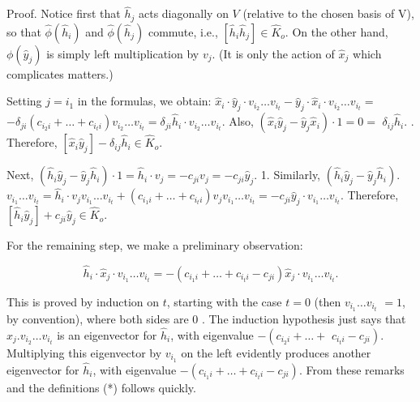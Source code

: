 \documentclass[10pt]{article}
\begin{document}
Proof. Notice first that $\hat{h}_{j}$ acts diagonally on $V$ (relative to the chosen basis of V), so that $\hat{\phi}\left(\hat{h}_{i}\right)$ and $\hat{\phi}\left(\hat{h}_{j}\right)$ commute, i.e., $\left[\hat{h}_{i} \hat{h}_{j}\right] \in \hat{K}_{o}$. On the other hand, $\phi\left(\hat{y}_{j}\right)$ is simply left multiplication by $v_{j}$. (It is only the action of $\hat{x}_{j}$ which complicates matters.)

Setting $j=i_{1}$ in the formulas, we obtain: $\hat{x}_{i} \cdot \hat{y}_{j} \cdot v_{i_{2}} \ldots v_{i_{t}}-\hat{y}_{j} \cdot \hat{x}_{i} \cdot v_{i_{2}} \ldots v_{i_{t}}=$ $-\delta_{j i}\left(c_{i_{2} i}+\ldots+c_{i_{t} i}\right) v_{i_{2}} \ldots v_{i_{t}}=\delta_{j i} \hat{h}_{i} \cdot v_{i_{2}} \ldots v_{i_{t}}$. Also, $\left(\hat{x}_{i} \hat{y}_{j}-\hat{y}_{j} \hat{x}_{i}\right) \cdot 1=0=$ $\delta_{i j} \hat{h}_{i}$. . Therefore, $\left[\hat{x}_{i} \hat{y}_{j}\right]-\delta_{i j} \hat{h}_{i} \in \widehat{K}_{o}$.

Next, $\left(\hat{h}_{i} \hat{y}_{j}-\hat{y}_{j} \hat{h}_{i}\right) \cdot 1=\hat{h}_{i} \cdot v_{j}=-c_{j i} v_{j}=-c_{j i} \hat{y}_{j}$. 1. Similarly, $\left(\hat{h}_{i} \hat{y}_{j}-\hat{y}_{j} \hat{h}_{i}\right)$. $v_{i_{1}} \ldots v_{i_{t}}=\hat{h}_{i} \cdot v_{j} v_{i_{1}} \ldots v_{i_{t}}+\left(c_{i_{1} i}+\ldots+c_{i_{t} i}\right) v_{j} v_{i_{1}} \ldots v_{i_{t}}=-c_{j i} \hat{y}_{j} \cdot v_{i_{1}} \ldots v_{i_{t}}$. Therefore, $\left[\hat{h}_{i} \hat{y}_{j}\right]+c_{j i} \hat{y}_{j} \in \hat{K}_{o}$.

For the remaining step, we make a preliminary observation:


\begin{equation*}
\hat{h}_{i} \cdot \hat{x}_{j} \cdot v_{i_{1}} \ldots v_{i_{t}}=-\left(c_{i_{1} i}+\ldots+c_{i_{t} i}-c_{j i}\right) \hat{x}_{j} \cdot v_{i_{1}} \ldots v_{i_{t}} . \tag{*}
\end{equation*}


This is proved by induction on $t$, starting with the case $t=0$ (then $v_{i_{1}} \ldots v_{i_{t}}$ $=1$, by convention), where both sides are 0 . The induction hypothesis just says that $\hat{x}_{j} . v_{i_{2}} \ldots v_{i_{t}}$ is an eigenvector for $\hat{h}_{i}$, with eigenvalue $-\left(c_{i_{2} i}+\ldots+\right.$ $\left.c_{i_{t} i}-c_{j i}\right)$. Multiplying this eigenvector by $v_{i_{1}}$ on the left evidently produces another eigenvector for $\hat{h}_{i}$, with eigenvalue $-\left(c_{i_{1} i}+\ldots+c_{i_{t} i}-c_{j i}\right)$. From these remarks and the definitions (*) follows quickly.
\end{document}
